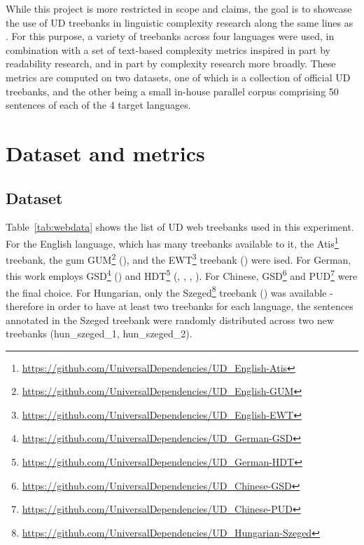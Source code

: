 \documentclass[11pt]{article}
\begin{document}
While this project is more restricted in scope and claims, the goal is to showcase the use of UD treebanks in linguistic complexity research along the same lines as \citealp{berdicevskis-etal-2018-using}. For this purpose, a variety of treebanks across four languages were used, in combination with a set of text-based complexity metrics inspired in part by readability research, and in part by complexity research more broadly. These metrics are computed on two datasets, one of which is a collection of official UD treebanks, and the other being a small in-house parallel corpus comprising 50 sentences of each of the 4 target languages.

\section{Dataset and metrics}

\subsection{Dataset}




Table~\ref{tab:webdata} shows the list of UD web treebanks used in this experiment. For the English language, which has many treebanks available to it, the Atis\footnote{\url{https://github.com/UniversalDependencies/UD_English-Atis}} treebank, the gum GUM\footnote{\url{https://github.com/UniversalDependencies/UD_English-GUM}} (\citealp{berzak2016tle}), and the EWT\footnote{\url{https://github.com/UniversalDependencies/UD_English-EWT}} treebank (\citealp{silveira14gold}) were ised. For German, this work employs GSD\footnote{\url{https://github.com/UniversalDependencies/UD_German-GSD}} (\citealp{mcdonald-etal-2013-universal}) and HDT\footnote{\url{https://github.com/UniversalDependencies/UD_German-HDT}} (\citealp{borges-volker-etal-2019-hdt}, \citealp{hennig-kohn-2017-dependency}, \citealp{hdtextra}, \citealp{hdtguide}). For Chinese, GSD\footnote{\url{https://github.com/UniversalDependencies/UD_Chinese-GSD}} and PUD\footnote{\url{https://github.com/UniversalDependencies/UD_Chinese-PUD}} were the final choice. For Hungarian, only the Szeged\footnote{\url{https://github.com/UniversalDependencies/UD_Hungarian-Szeged}} treebank (\citealp{szeged}) was available - therefore in order to have at least two treebanks for each language, the sentences annotated in the Szeged treebank were randomly distributed across two new treebanks (hun\_szeged\_1, hun\_szeged\_2).
\end{document}
